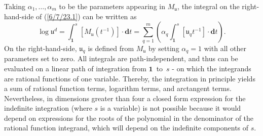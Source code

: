 \documentclass{amsart}
\theoremstyle{definition}
\numberwithin{theorem}{section}
\numberwithin{equation}{section}
\begin{document}
Taking $\alpha_1,\dots,\alpha_m$ to be the parameters appearing in $M_{\mathfrak{u}}$, the integral on the right-hand-side of (\ref{6/7/23.1}) can be written as 
\begin{equation}\label{9/26/23.1} \log  \mathfrak{u}^d = \int_{\mathbf{1}}^s [M_{\mathfrak{u}} (t^{-1})]\cdot \mathbf{d}t =\sum_{q=1}^m \left(\alpha_q \int_{\mathbf{1}}^s [\mathfrak{u}_q t^{-1}]\cdot \mathbf{d}t\right).\end{equation}
On the right-hand-side, $\mathfrak{u}_q$ is defined from $M_\mathfrak{u}$ by setting $\alpha_q =1$ with all other parameters set to zero.   All integrals are path-independent, and thus can be evaluated on a linear path of integration from \mbox{$\mathbf{1}$ to $s$} - on which the integrands are rational functions of one variable.  Thereby, the integration in principle yields a sum of rational function terms, logarithm terms, and arctangent terms.  Nevertheless, in dimensions greater than four a closed form expression for the indefinite integration (where $s$ is a variable) is not possible because it would depend on expressions for the roots of the polynomial in the denominator of the rational function integrand, which will depend on the indefinite components of $s$.  
\end{document}
